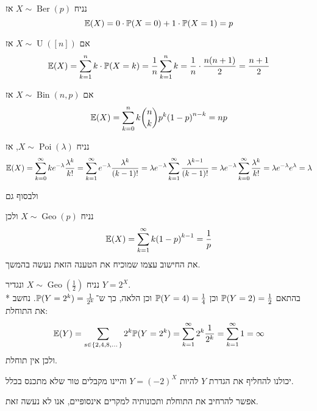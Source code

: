 \begin{example}
	נניח $X \sim \operatorname{Ber}(p)$ אז
	\[
		\mathbb{E}(X) = 0 \cdot \mathbb{P}(X = 0) + 1 \cdot \mathbb{P}(X = 1) = p
	\]
\end{example}
\begin{example}
	אם $X \sim \operatorname{U}([n])$ אז
	\[
		\mathbb{E}(X) = \sum_{k = 1}^n k \cdot \mathbb{P}(X = k)
		= \frac{1}{n} \sum_{k = 1}^{n} k
		= \frac{1}{n} \cdot \frac{n(n + 1)}{2}
		= \frac{n + 1}{2}
	\]
\end{example}
\begin{example}
	אם $X \sim \operatorname{Bin}(n, p)$ אז
	\[
		\mathbb{E}(X)
		= \sum_{k = 0}^{n} k \binom{n}{k} p^k {(1 - p)}^{n - k}
		= np
	\]
\end{example}
\begin{example}
	נניח $X \sim \operatorname{Poi}(\lambda)$, אז
	\[
		\mathbb{E}(X)
		= \sum_{k = 0}^\infty k e^{-\lambda} \frac{\lambda^k}{k!}
		= \sum_{k = 1}^\infty e^{-\lambda} \frac{\lambda^k}{(k - 1)!}
		= \lambda e^{-\lambda} \sum_{k = 1}^\infty \frac{\lambda^{k - 1}}{(k - 1)!}
		= \lambda e^{-\lambda} \sum_{k = 0}^\infty \frac{\lambda^k}{k!}
		= \lambda e^{-\lambda} e^\lambda
		= \lambda
	\]
\end{example}
ולבסוף גם
\begin{example}
	נניח $X \sim \operatorname{Geo}(p)$ ולכן
	\[
		\mathbb{E}(X)
		= \sum_{k = 1}^{\infty} k {(1 - p)}^{k - 1}
		= \frac{1}{p}
	\]
	את החישוב עצמו שמוכיח את הטענה הזאת נעשה בהמשך.
\end{example}
\begin{example}
	נניח $X \sim \operatorname{Geo}(\frac{1}{2})$ ונגדיר $Y = 2^X$. \\*
	בהתאם $\mathbb{P}(Y = 2) = \frac{1}{2}$ וכן $\mathbb{P}(Y = 4) = \frac{1}{4}$ וכן הלאה, כך ש־$\mathbb{P}(Y = 2^k) = \frac{1}{2^k}$.
	נחשב את התוחלת:
	\[
		\mathbb{E}(Y)
		= \sum_{s \in \{2, 4, 8, \dots\}} 2^k \mathbb{P}(Y = 2^k)
		= \sum_{k = 1}^{\infty} 2^k \frac{1}{2^k}
		= \sum_{k = 1}^{\infty} 1
		= \infty
	\]
	ולכן אין תוחלת.

	יכולנו להחליף את הגדרת $Y$ להיות $Y = {(-2)}^X$ והיינו מקבלים טור שלא מתכנס בכלל.
\end{example}
\begin{remark}
	אפשר להרחיב את התוחלת ותכונותיה למקרים אינסופיים, אנו לא נעשה זאת.
\end{remark}

